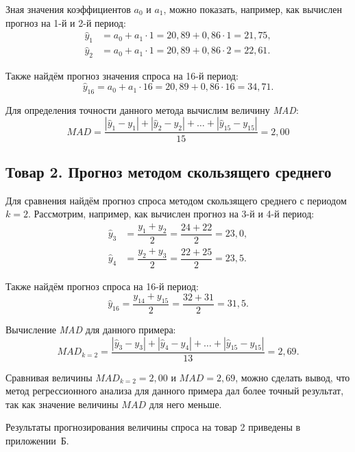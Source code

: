 Зная значения коэффициентов $a_0$ и $a_1$, можно показать, например, как
вычислен прогноз на 1-й и 2-й период:
\begin{align*}
  \hat{y}_1 &= a_0 + a_1 \cdot 1 = 20{,}89 + 0{,}86 \cdot 1 = 21{,}75, \\
  \hat{y}_2 &= a_0 + a_1 \cdot 1 = 20{,}89 + 0{,}86 \cdot 2 = 22{,}61.
\end{align*}

Также найдём прогноз значения спроса на 16-й период:
\begin{equation*}
  \hat{y}_{16} = a_0 + a_1 \cdot 16 = 20{,}89 + 0{,}86 \cdot 16 = 34{,}71.
\end{equation*}

Для определения точности данного метода вычислим величину \textit{MAD}:
\[
  MAD = \dfrac{|\hat{y}_1 - y_1| + |\hat{y}_2 - y_2| + \dots + |\hat{y}_{15} - y_{15}|}{15} = 2{,}00
\]


\subsection{Товар 2. Прогноз методом скользящего среднего}

Для сравнения найдём прогноз спроса методом скользящего среднего
с периодом $k = 2$. Рассмотрим, например, как вычислен прогноз
на 3-й и 4-й период:
\begin{align*}
  \hat{y}_3 &= \dfrac{y_1 + y_2}{2} = \dfrac{24 + 22}{2} = 23{,}0, \\
  \hat{y}_4 &= \dfrac{y_2 + y_3}{2} = \dfrac{22 + 25}{2} = 23{,}5.
\end{align*}

Также найдём прогноз спроса на 16-й период:
\begin{equation*}
  \hat{y}_{16} = \dfrac{y_{14} + y_{15}}{2} = \dfrac{32 + 31}{2} = 31{,}5.
\end{equation*}

Вычисление \textit{MAD} для данного примера:
\[
  MAD_{k = 2} = \dfrac{|\hat{y}_3 - y_3| + |\hat{y}_4 - y_4| + \dots + |\hat{y}_{15} - y_{15}|}{13} = 2{,}69.
\]

Сравнивая величины $MAD_{k = 2} = 2{,}00$ и $MAD = 2{,}69$, можно сделать вывод, что
метод регрессионного анализа для данного примера дал более точный результат, так как
значение величины $MAD$ для него меньше.

Результаты прогнозирования величины спроса на товар 2 приведены в приложении~Б.
